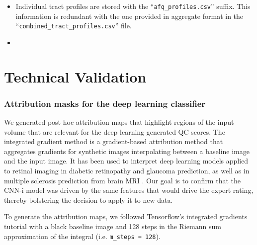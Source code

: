 \documentclass[fleqn,10pt,inline]{wlscirep}
\begin{document}
\begin{itemize}
\item Individual tract profiles are stored with the ``\texttt{afq\_profiles.csv}'' suffix. This information is redundant with the one provided in aggregate format in the ``\texttt{combined\_tract\_profiles.csv}'' file.

\item {}

\end{itemize}

\section*{Technical Validation}

\subsubsection*{Attribution masks for the deep learning classifier}

We generated post-hoc attribution maps that highlight regions of the input
volume that are relevant for the deep learning generated QC scores. The integrated gradient method
\cite{sundararajan2017axiomatic} is a gradient-based attribution method
\cite{ancona2019gradient} that aggregates gradients for synthetic images
interpolating between a baseline image and the input image. It has been used to
interpret deep learning models applied to retinal imaging in diabetic
retinopathy \cite{sayres2019using} and glaucoma \cite{Mehta2021-zp} prediction,
as well as in multiple sclerosis prediction from brain MRI
\cite{wargnier-dauchelle2021interpretable}. Our goal is to confirm that the
CNN-i model
was driven by the same features that would drive the expert rating,
thereby bolstering the decision to apply it to new data.

To generate the attribution maps, we followed Tensorflow's integrated gradients
tutorial \cite{integrated-gradients-tutorial} with a black baseline image and
128 steps in the Riemann sum approximation of the integral (i.e.
\texttt{m\_steps = 128}).
\end{document}
